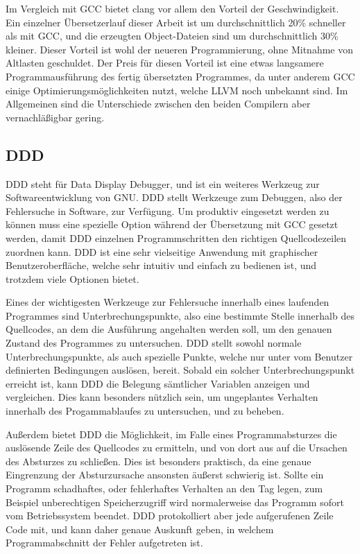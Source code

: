 Im Vergleich mit GCC bietet clang vor allem den Vorteil der Geschwindigkeit. Ein einzelner Übersetzerlauf dieser Arbeit ist um durchschnittlich 20\% schneller als mit GCC, und die erzeugten Object-Dateien
sind um durchschnittlich 30\% kleiner. Dieser Vorteil ist wohl der neueren Programmierung, ohne Mitnahme von Altlasten geschuldet. Der Preis für diesen Vorteil ist eine etwas langsamere Programmausführung
des fertig übersetzten Programmes, da unter anderem GCC einige Optimierungsmöglichkeiten nutzt, welche LLVM noch unbekannt sind. Im Allgemeinen sind die Unterschiede zwischen den beiden Compilern aber
vernachläßigbar gering.

\subsection{DDD}
DDD steht für Data Display Debugger, und ist ein weiteres Werkzeug zur Softwareentwicklung von GNU. DDD stellt Werkzeuge zum Debuggen, also der Fehlersuche in Software, zur Verfügung. Um produktiv eingesetzt
werden zu können muss eine spezielle Option während der Übersetzung mit GCC gesetzt werden, damit DDD einzelnen Programmschritten den richtigen Quellcodezeilen zuordnen kann. DDD ist eine sehr vielseitige
Anwendung mit graphischer Benutzeroberfläche, welche sehr intuitiv und einfach zu bedienen ist, und trotzdem viele Optionen bietet.

Eines der wichtigesten Werkzeuge zur Fehlersuche innerhalb eines laufenden Programmes sind Unterbrechungspunkte, also eine bestimmte Stelle innerhalb des Quellcodes, an dem die Ausführung angehalten werden 
soll, um den genauen Zustand des Programmes zu untersuchen. DDD stellt sowohl normale Unterbrechungspunkte, als auch spezielle Punkte, welche nur unter vom Benutzer definierten Bedingungen auslösen, bereit.
Sobald ein solcher Unterbrechungspunkt erreicht ist, kann DDD die Belegung sämtlicher Variablen anzeigen und vergleichen. Dies kann besonders nützlich sein, um ungeplantes Verhalten innerhalb des
Progammablaufes zu untersuchen, und zu beheben. 

Außerdem bietet DDD die Möglichkeit, im Falle eines Programmabsturzes die auslösende Zeile des Quellcodes zu ermitteln, und von dort aus auf die Ursachen des Absturzes zu schließen. Dies ist besonders
praktisch, da eine genaue Eingrenzung der Absturzursache ansonsten äußerst schwierig ist. Sollte ein Programm schadhaftes, oder fehlerhaftes Verhalten an den Tag legen, zum Beispiel unberechtigen Speicherzugriff
wird normalerweise das Programm sofort vom Betriebssystem beendet. DDD protokolliert aber jede aufgerufenen Zeile Code mit, und kann daher genaue Auskunft geben, in welchem Programmabschnitt der
Fehler aufgetreten ist.

